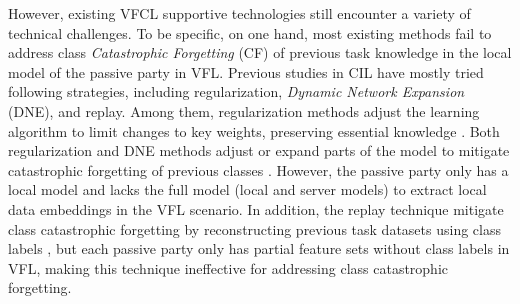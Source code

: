 




However, existing VFCL supportive technologies still encounter a variety of technical challenges. 
To be specific, on one hand, most existing methods fail to address class \textit{Catastrophic Forgetting} (CF) of previous task knowledge in the local model of the passive party in VFL. 
Previous studies in CIL have mostly tried following strategies, including regularization, {\em Dynamic Network Expansion} (DNE), and replay. 
Among them, regularization methods adjust the learning algorithm to limit changes to key weights, preserving essential knowledge \cite{chen2021overcoming,yu2024overcoming}.
Both regularization and DNE methods adjust or expand parts of the model to mitigate catastrophic forgetting of previous classes \cite{luo2023gradma}.
However, the passive party only has a local model and lacks the full model (local and server models) to extract local data embeddings in the VFL scenario. 
In addition, the replay technique mitigate class catastrophic forgetting by reconstructing previous task datasets using class labels \cite{li2024towards}, but each passive party only has partial feature sets without class labels in VFL, making this technique ineffective for addressing class catastrophic forgetting.



